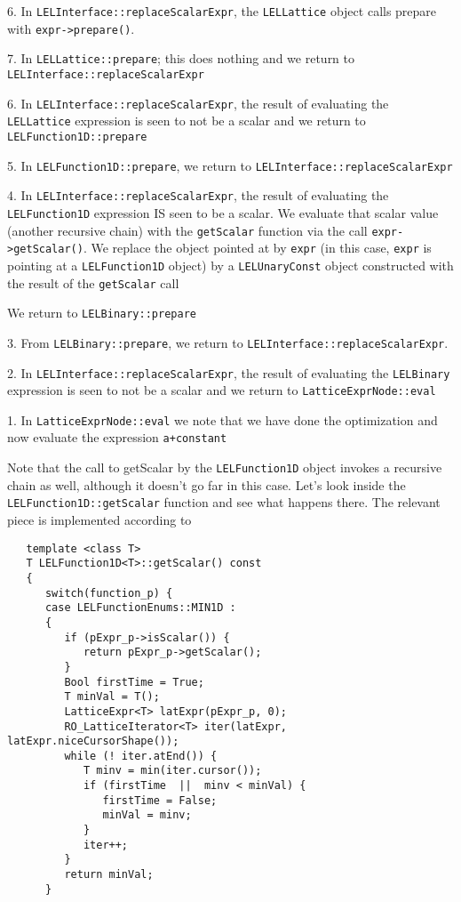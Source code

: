 6. In {\tt LELInterface::replaceScalarExpr}, the {\tt LELLattice} object calls 
prepare with {\tt expr->prepare()}.

7. In {\tt LELLattice::prepare}; this does nothing and we return 
to {\tt LELInterface::replaceScalarExpr}

6. In {\tt LELInterface::replaceScalarExpr}, the result of evaluating 
the  {\tt LELLattice} expression is seen to not be a scalar and 
we return to  {\tt LELFunction1D::prepare}

5. In {\tt LELFunction1D::prepare}, we return to {\tt LELInterface::replaceScalarExpr} 

4. In {\tt LELInterface::replaceScalarExpr}, the result of evaluating 
the {\tt LELFunction1D} expression IS seen to be a scalar.  We evaluate 
that scalar value (another recursive chain) with the {\tt getScalar} function via 
the call {\tt expr->getScalar()}. We replace  the object pointed at by {\tt expr} 
(in this case, {\tt expr} is pointing at a {\tt LELFunction1D} object) 
by a {\tt LELUnaryConst} object constructed with the result of the 
{\tt getScalar} call

We return to {\tt LELBinary::prepare}

3. From {\tt LELBinary::prepare}, we return to {\tt LELInterface::replaceScalarExpr}.

2. In {\tt LELInterface::replaceScalarExpr}, the result of evaluating 
the {\tt LELBinary} expression is seen to not be a scalar and 
we return to {\tt LatticeExprNode::eval}

1. In {\tt LatticeExprNode::eval} we note that we have done the optimization 
and now evaluate the expression {\tt a+constant}



Note that the call to getScalar by the {\tt LELFunction1D} object invokes a recursive
chain as well, although it doesn't go far in this case.  Let's look inside the
{\tt LELFunction1D::getScalar} function and see what happens there.  The relevant piece
is implemented according to

\begin{verbatim}
   template <class T>
   T LELFunction1D<T>::getScalar() const
   {
      switch(function_p) {
      case LELFunctionEnums::MIN1D :
      {
         if (pExpr_p->isScalar()) {
            return pExpr_p->getScalar();
         }   
         Bool firstTime = True;
         T minVal = T();
         LatticeExpr<T> latExpr(pExpr_p, 0);
         RO_LatticeIterator<T> iter(latExpr, latExpr.niceCursorShape());
         while (! iter.atEnd()) {
            T minv = min(iter.cursor());
            if (firstTime  ||  minv < minVal) {
               firstTime = False;
               minVal = minv;
            }
            iter++;
         }
         return minVal;
      }
\end{verbatim}


